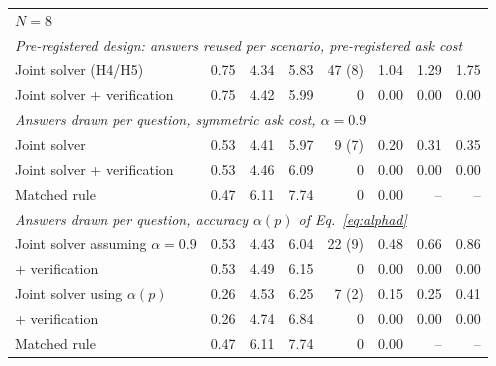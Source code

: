 \documentclass[a4paper,fleqn]{cas-dc}
\begin{document}
\begin{table}
\begin{tabular*}{\textwidth}{@{\extracolsep{\fill}}lrrrrrrr}
\midrule
\multicolumn{8}{l}{$N = 8$} \\
\multicolumn{8}{l}{\emph{Pre-registered design: answers reused per scenario, pre-registered ask cost}} \\
Joint solver (H4/H5) & 0.75 & 4.34 & 5.83 & 47 (8) & 1.04 & 1.29 & 1.75 \\
Joint solver + verification & 0.75 & 4.42 & 5.99 & 0 & 0.00 & 0.00 & 0.00 \\
\multicolumn{8}{l}{\emph{Answers drawn per question, symmetric ask cost, $\alpha = 0.9$}} \\
Joint solver & 0.53 & 4.41 & 5.97 & 9 (7) & 0.20 & 0.31 & 0.35 \\
Joint solver + verification & 0.53 & 4.46 & 6.09 & 0 & 0.00 & 0.00 & 0.00 \\
Matched rule & 0.47 & 6.11 & 7.74 & 0 & 0.00 & -- & -- \\
\multicolumn{8}{l}{\emph{Answers drawn per question, accuracy $\alpha(p)$ of Eq.~\eqref{eq:alphad}}} \\
Joint solver assuming $\alpha = 0.9$ & 0.53 & 4.43 & 6.04 & 22 (9) & 0.48 & 0.66 & 0.86 \\
\quad + verification & 0.53 & 4.49 & 6.15 & 0 & 0.00 & 0.00 & 0.00 \\
Joint solver using $\alpha(p)$ & 0.26 & 4.53 & 6.25 & 7 (2) & 0.15 & 0.25 & 0.41 \\
\quad + verification & 0.26 & 4.74 & 6.84 & 0 & 0.00 & 0.00 & 0.00 \\
Matched rule & 0.47 & 6.11 & 7.74 & 0 & 0.00 & -- & -- \\
\bottomrule
\end{tabular*}
\end{table}
\end{document}
